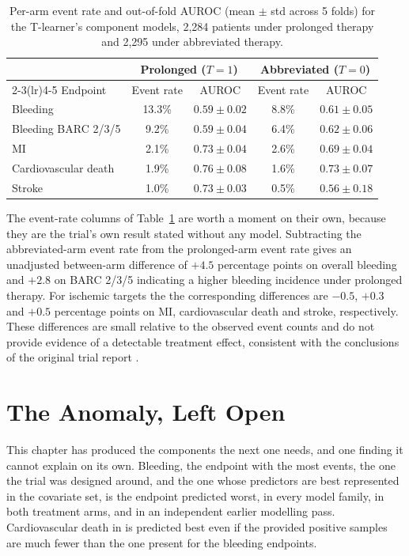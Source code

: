 \begin{table}[h]
\centering
\caption{Per-arm event rate and out-of-fold AUROC (mean $\pm$ std across
5 folds) for the T-learner's component models, 2,284 patients under prolonged
therapy and 2,295 under abbreviated therapy.}
\label{tab:per-arm}
\begin{tabular}{lcccc}
\toprule
 & \multicolumn{2}{c}{Prolonged ($T=1$)} & \multicolumn{2}{c}{Abbreviated ($T=0$)} \\
\cmidrule(lr){2-3}\cmidrule(lr){4-5}
Endpoint & Event rate & AUROC & Event rate & AUROC \\
\midrule
Bleeding             & 13.3\% & $0.59 \pm 0.02$ &  8.8\% & $0.61 \pm 0.05$ \\
Bleeding BARC 2/3/5  &  9.2\% & $0.59 \pm 0.04$ &  6.4\% & $0.62 \pm 0.06$ \\
MI                   &  2.1\% & $0.73 \pm 0.04$ &  2.6\% & $0.69 \pm 0.04$ \\
Cardiovascular death &  1.9\% & $0.76 \pm 0.08$ &  1.6\% & $0.73 \pm 0.07$ \\
Stroke               &  1.0\% & $0.73 \pm 0.03$ &  0.5\% & $0.56 \pm 0.18$ \\
\bottomrule
\end{tabular}
\end{table}

The event-rate columns of Table~\ref{tab:per-arm} are worth a moment on their
own, because they are the trial's own result stated without any model. Subtracting the abbreviated-arm 
event rate from the prolonged-arm event rate gives an
unadjusted between-arm difference of $+4.5$ percentage points on overall bleeding and $+2.8$ on BARC 2/3/5 indicating a higher bleeding incidence
under prolonged therapy. For ischemic targets the the corresponding differences are $-0.5$, $+0.3$ and $+0.5$
percentage points on MI, cardiovascular death and stroke, respectively. These differences
are small relative to the observed event counts and do not provide evidence
of a detectable treatment effect, consistent with the conclusions of the
original trial report \citep{valgimigli2021masterdapt}.

\section{The Anomaly, Left Open}

This chapter has produced the components the next one needs, and one finding
it cannot explain on its own. Bleeding, the endpoint with the most events,
the one the trial was designed around, and the one whose predictors are best
represented in the covariate set, is the endpoint predicted worst, in every
model family, in both treatment arms, and in an independent earlier modelling
pass.
Cardiovascular death in is predicted best even if the provided positive
samples are much
fewer than the one present for the bleeding endpoints.

